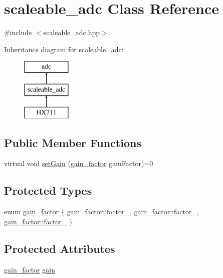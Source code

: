 \hypertarget{classscaleable__adc}{}\section{scaleable\+\_\+adc Class Reference}
\label{classscaleable__adc}


{\ttfamily \#include $<$scaleable\+\_\+adc.\+hpp$>$}

Inheritance diagram for scaleable\+\_\+adc\+:\begin{figure}[H]
\begin{center}
\leavevmode
\includegraphics[height=3.000000cm]{classscaleable__adc}
\end{center}
\end{figure}
\subsection*{Public Member Functions}
\begin{DoxyCompactItemize}
\item 
virtual void \hyperlink{classscaleable__adc_ab208353fb3722efe3b9f101f17bf04df}{set\+Gain} (\hyperlink{classscaleable__adc_a9d9f30302ee38e7249ae2d8b10eeac05}{gain\+\_\+factor} gain\+Factor)=0
\end{DoxyCompactItemize}
\subsection*{Protected Types}
\begin{DoxyCompactItemize}
\item 
enum \hyperlink{classscaleable__adc_a9d9f30302ee38e7249ae2d8b10eeac05}{gain\+\_\+factor} \{ \hyperlink{classscaleable__adc_a9d9f30302ee38e7249ae2d8b10eeac05a2957e591b731c8845efc9bf474fcdc01}{gain\+\_\+factor\+::factor\+\_}, 
\hyperlink{classscaleable__adc_a9d9f30302ee38e7249ae2d8b10eeac05adc8cbd585a194cfa71a291f2b95640cc}{gain\+\_\+factor\+::factor\+\_}, 
\hyperlink{classscaleable__adc_a9d9f30302ee38e7249ae2d8b10eeac05abe85151e52c76a5d91f754b0a27f2c65}{gain\+\_\+factor\+::factor\+\_}
 \}
\end{DoxyCompactItemize}
\subsection*{Protected Attributes}
\begin{DoxyCompactItemize}
\item 
\hyperlink{classscaleable__adc_a9d9f30302ee38e7249ae2d8b10eeac05}{gain\+\_\+factor} \hyperlink{classscaleable__adc_a317cb5c4c9f6e820ab8104dec71852f6}{gain}
\end{DoxyCompactItemize}


